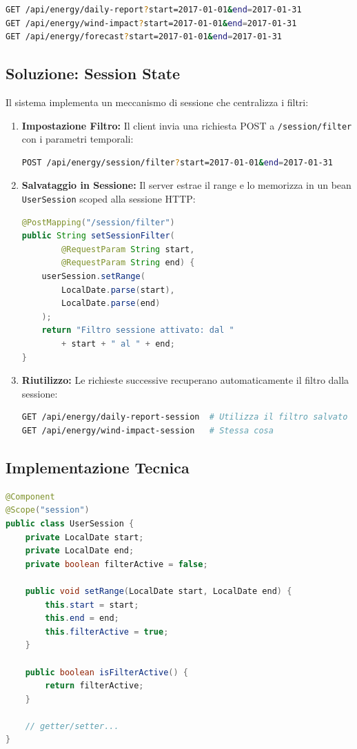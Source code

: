 \documentclass[a4paper,12pt]{report}
\begin{document}
\begin{lstlisting}[language=bash]
GET /api/energy/daily-report?start=2017-01-01&end=2017-01-31
GET /api/energy/wind-impact?start=2017-01-01&end=2017-01-31
GET /api/energy/forecast?start=2017-01-01&end=2017-01-31
\end{lstlisting}

\subsection{Soluzione: Session State}
Il sistema implementa un meccanismo di sessione che centralizza i filtri:

\begin{enumerate}
    \item \textbf{Impostazione Filtro:} Il client invia una richiesta POST a \texttt{/session/filter} con i parametri temporali:
    \begin{lstlisting}[language=bash]
POST /api/energy/session/filter?start=2017-01-01&end=2017-01-31
    \end{lstlisting}
    
    \item \textbf{Salvataggio in Sessione:} Il server estrae il range e lo memorizza in un bean \texttt{UserSession} scoped alla sessione HTTP:
    \begin{lstlisting}[language=Java]
@PostMapping("/session/filter")
public String setSessionFilter(
        @RequestParam String start, 
        @RequestParam String end) {
    userSession.setRange(
        LocalDate.parse(start), 
        LocalDate.parse(end)
    );
    return "Filtro sessione attivato: dal " 
        + start + " al " + end;
}
    \end{lstlisting}
    
    \item \textbf{Riutilizzo:} Le richieste successive recuperano automaticamente il filtro dalla sessione:
    \begin{lstlisting}[language=bash]
GET /api/energy/daily-report-session  # Utilizza il filtro salvato
GET /api/energy/wind-impact-session   # Stessa cosa
    \end{lstlisting}
\end{enumerate}

\subsection{Implementazione Tecnica}
\begin{lstlisting}[language=Java, caption=UserSession Bean]
@Component
@Scope("session")
public class UserSession {
    private LocalDate start;
    private LocalDate end;
    private boolean filterActive = false;
    
    public void setRange(LocalDate start, LocalDate end) {
        this.start = start;
        this.end = end;
        this.filterActive = true;
    }
    
    public boolean isFilterActive() {
        return filterActive;
    }
    
    // getter/setter...
}
\end{lstlisting}
\end{document}

